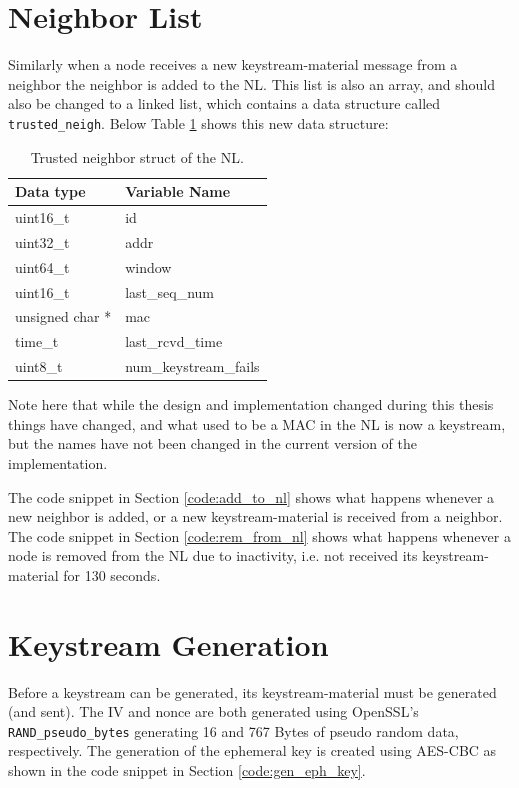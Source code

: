 \section{Neighbor List}
Similarly when a node receives a new keystream-material message from a neighbor
the neighbor is added to the \ac{NL}. This list is also an array, and should
also be changed to a linked list, which contains a data structure called
\texttt{trusted\_neigh}. Below Table \ref{tab:impl_nl_content} shows this new
data structure:
\begin{table}[h]
	\centering
	\begin{tabular}{| l | l |}\hline
 		\textbf{Data type} & \textbf{Variable Name}\\\hline
		uint16\_t & id\\\hline
		uint32\_t & addr\\\hline
		uint64\_t & window\\\hline 
		uint16\_t & last\_seq\_num\\\hline
		unsigned char * & mac\\\hline 
		time\_t & last\_rcvd\_time\\\hline
		uint8\_t & num\_keystream\_fails\\\hline 
	\end{tabular}
	\caption{Trusted neighbor struct of the NL.}
	\label{tab:impl_nl_content}
\end{table}
Note here that while the design and implementation changed during this thesis
things have changed, and what used to be a \ac{MAC} in the NL is now a
keystream, but the names have not been changed in the current version of the
implementation.

The code snippet in Section \ref{code:add_to_nl} shows what happens whenever a
new neighbor is added, or a new keystream-material is received from a neighbor.
The code snippet in Section \ref{code:rem_from_nl} shows what happens whenever a
node is removed from the NL due to inactivity, i.e. not received its
keystream-material for 130 seconds.

\section{Keystream Generation}
Before a keystream can be generated, its keystream-material must be generated
(and sent). The IV and nonce are both generated using OpenSSL's
\texttt{RAND\_pseudo\_bytes} generating 16 and 767 Bytes of pseudo random data,
respectively. The generation of the ephemeral key is created using AES-CBC as
shown in the code snippet in Section \ref{code:gen_eph_key}.

